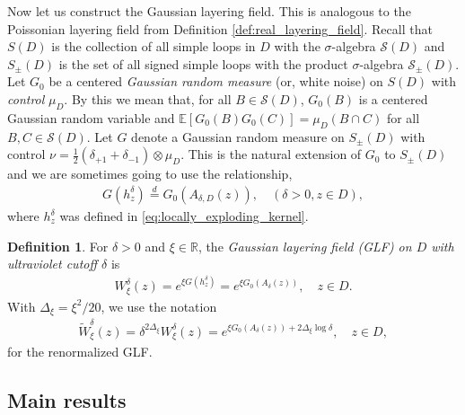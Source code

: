 \documentclass[a4paper, 11pt, reqno]{amsart}
\theoremstyle{definition} \newtheorem{defn}{Definition}[section]
\theoremstyle{remark} \newtheorem{rem}[defn]{Remark}
\theoremstyle{remark} \newtheorem*{rem*}{Remark}
\theoremstyle{plain} \newtheorem{thm}[defn]{Theorem}
\theoremstyle{plain} \newtheorem{lem}[defn]{Lemma}
\theoremstyle{plain} \newtheorem{prop}[defn]{Proposition}
\theoremstyle{plain} \newtheorem{cor}[defn]{Corollary}
\theoremstyle{remark} \newtheorem{exm}[defn]{\textbf{Example}}
\theoremstyle{remark} \newtheorem{exms}[defn]{\textbf{Examples}}
\theoremstyle{remark} \newtheorem*{bl}{}
\numberwithin{equation}{section} %
\newcommand{\mc}{\mathcal}
\newcommand{\R}{\mathbb{R}}
\newcommand{\E}{\mathbb{E}}
\begin{document}
    Now let us construct the Gaussian layering field. This is analogous to the Poissonian layering field from Definition \ref{def:real_layering_field}. Recall that $S(D)$ is the collection of all simple loops in $D$ with the $\sigma$-algebra $\mc{S}(D)$ and $S_{\pm} (D)$ is the set of all signed simple loops with the product $\sigma$-algebra $ \mc{S}_{\pm} (D)$. Let $G_0$ be a centered \textit{Gaussian random measure} (or, white noise) on $S(D)$ with \textit{control} $\mu_D$. By this we mean that, for all $B \in \mc{S}(D)$, $G_0(B)$ is a centered Gaussian random variable and	
	$\E [G_0(B) G_0(C)] = \mu_D(B\cap C)$
	for all $B, C \in \mc{S}(D)$. Let $G$ denote a Gaussian random measure on $S_{\pm} (D)$ with control $\nu = \frac{1}{2}(\delta_{+1} + \delta_{-1}) \otimes \mu_D$.  This is the natural extension of $G_0$ to $S_{\pm} (D)$ and we are sometimes going to use the relationship,
    \begin{align}
        G(h^{\delta}_z) \stackrel{d}{=} G_0(A_{\delta, D}(z)), \quad( \delta >0 ,  z \in D),
    \end{align}
    where $h^{\delta}_z$ was defined in \eqref{eq:locally_exploding_kernel}.
    
    \begin{defn}\label{def:GLF}
    For $\delta>0$ and $\xi \in \R$, the \textit{Gaussian layering field (GLF) on $D$ with ultraviolet cutoff $\delta$} is
	\begin{align}\label{eq:W_delta_def}
		W^{\delta}_{\xi}(z) = e^{\xi G(h^{\delta}_z)} = e^{\xi G_0 (A_{\delta}(z))}, \quad z \in D.
	\end{align}	
	With $\Delta_{\xi} = \xi^2/20$, we use the notation 
    \begin{align}\label{eq:W_delta_renorm_def}
        \tilde{W}^{\delta}_{\xi}(z) = \delta^{2\Delta_{\xi}} W^{\delta}_{\xi}(z) = e^{\xi G_0 (A_{\delta}(z)) + 2\Delta_{\xi} \log \delta}, \quad z \in D,
    \end{align}
    for the renormalized GLF.
    \end{defn}
    
	
	\subsection{Main results}\label{sec:prelim_main_results}
	
\end{document}
